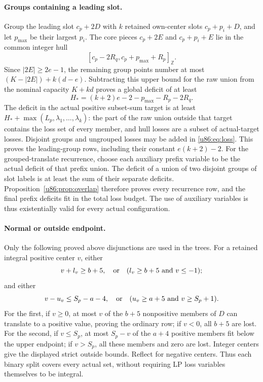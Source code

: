 \documentclass[11pt,a4paper]{article}
\theoremstyle{remark}
\newcommand{\Z}{\mathbb Z}
\begin{document}
\paragraph{Groups containing a leading slot.}
Group the leading slot $c_p+2D$ with $k$ retained own-center slots
$c_p+p_i+D$, and let $p_{\max}$ be their largest $p_i$.
The core pieces $c_p+2E$ and $c_p+p_i+E$ lie in the common integer hull
\[
 [c_p-2R_q,c_p+p_{\max}+R_p]_{\Z}.
\]
Since $|2E|\ge2e-1$, the remaining group points number at most
$(K-|2E|)+k(d-e)$. Subtracting this upper bound for the raw union from
the nominal capacity $K+kd$ proves a global deficit of at least
\[
 H_*=(k+2)e-2-p_{\max}-R_p-2R_q.
\]
The deficit in the actual positive subset-sum target is at least
$H_*+\max(L_p,\lambda_1,\ldots,\lambda_k)$: the part of the raw union
outside that target contains the loss set of every member, and hull
losses are a subset of actual-target losses. Disjoint groups and
ungrouped losses may be added in \eqref{u86:eq:loss}. This proves the
leading-group rows, including their constant $e(k+2)-2$.
For the grouped-translate recurrence, choose each auxiliary prefix
variable to be the actual deficit of that prefix union.
The deficit of a union of two disjoint groups of slot labels is at
least the sum of their separate deficits. Proposition~\ref{u86:prop:overlap}
therefore proves every recurrence row, and the final prefix deficits
fit in the total loss budget. The use of auxiliary variables is thus
existentially valid for every actual configuration.

\paragraph{Normal or outside endpoint.}
Only the following proved above disjunctions are used in the
trees. For a retained integral positive center $v$, either
\[
 v+l_v\ge b+5,
 \quad\hbox{or}\quad(l_v\ge b+5\ \hbox{and}\ v\le-1);
\]
and either
\[
 v-u_v\le S_p-a-4,
 \quad\hbox{or}\quad(u_v\ge a+5\ \hbox{and}\ v\ge S_p+1).
\]
For the first, if $v\ge0$, at most $v$ of the $b+5$ nonpositive
members of $D$ can translate to a positive value, proving the ordinary
row; if $v<0$, all $b+5$ are lost. For the second, if $v\le S_p$, at
most $S_p-v$ of the $a+4$ positive members fit below the upper endpoint;
if $v>S_p$, all these members and zero are lost. Integer centers give
the displayed strict outside bounds. Reflect for negative centers.
Thus each binary split covers every actual set, without requiring LP
loss variables themselves to be integral.
\end{document}
